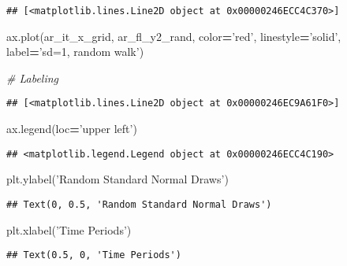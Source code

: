 \documentclass[
]{book}
\newenvironment{Shaded}{\begin{snugshade}}{\end{snugshade}}
\newcommand{\CommentTok}[1]{\textcolor[rgb]{0.56,0.35,0.01}{\textit{#1}}}
\newcommand{\NormalTok}[1]{#1}
\newcommand{\OperatorTok}[1]{\textcolor[rgb]{0.81,0.36,0.00}{\textbf{#1}}}
\newcommand{\StringTok}[1]{\textcolor[rgb]{0.31,0.60,0.02}{#1}}
\begin{document}
\begin{verbatim}
## [<matplotlib.lines.Line2D object at 0x00000246ECC4C370>]
\end{verbatim}

\begin{Shaded}
\begin{Highlighting}[]
\NormalTok{ax.plot(ar_it_x_grid, ar_fl_y2_rand,}
\NormalTok{                     color}\OperatorTok{=}\StringTok{'red'}\NormalTok{, linestyle}\OperatorTok{=}\StringTok{'solid'}\NormalTok{,}
\NormalTok{                     label}\OperatorTok{=}\StringTok{'sd=1, random walk'}\NormalTok{)}
                     
\CommentTok{# Labeling}
\end{Highlighting}
\end{Shaded}

\begin{verbatim}
## [<matplotlib.lines.Line2D object at 0x00000246EC9A61F0>]
\end{verbatim}

\begin{Shaded}
\begin{Highlighting}[]
\NormalTok{ax.legend(loc}\OperatorTok{=}\StringTok{'upper left'}\NormalTok{)}
\end{Highlighting}
\end{Shaded}

\begin{verbatim}
## <matplotlib.legend.Legend object at 0x00000246ECC4C190>
\end{verbatim}

\begin{Shaded}
\begin{Highlighting}[]
\NormalTok{plt.ylabel(}\StringTok{'Random Standard Normal Draws'}\NormalTok{)}
\end{Highlighting}
\end{Shaded}

\begin{verbatim}
## Text(0, 0.5, 'Random Standard Normal Draws')
\end{verbatim}

\begin{Shaded}
\begin{Highlighting}[]
\NormalTok{plt.xlabel(}\StringTok{'Time Periods'}\NormalTok{)}
\end{Highlighting}
\end{Shaded}

\begin{verbatim}
## Text(0.5, 0, 'Time Periods')
\end{verbatim}
\end{document}
